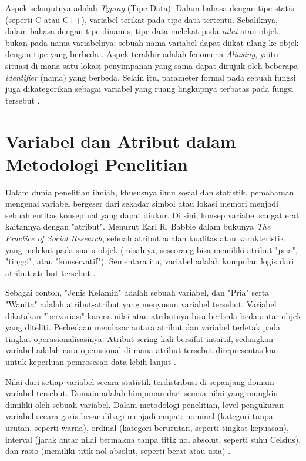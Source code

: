 \documentclass[11pt,a4paper]{article}
\begin{document}
Aspek selanjutnya adalah \textit{Typing} (Tipe Data). Dalam bahasa dengan tipe statis (seperti C atau C++), variabel terikat pada tipe data tertentu. Sebaliknya, dalam bahasa dengan tipe dinamis, tipe data melekat pada \textit{nilai} atau objek, bukan pada nama variabelnya; sebuah nama variabel dapat diikat ulang ke objek dengan tipe yang berbeda \cite{wikipedia_cs}. Aspek terakhir adalah fenomena \textit{Aliasing}, yaitu situasi di mana satu lokasi penyimpanan yang sama dapat dirujuk oleh beberapa \textit{identifier} (nama) yang berbeda. Selain itu, parameter formal pada sebuah fungsi juga dikategorikan sebagai variabel yang ruang lingkupnya terbatas pada fungsi tersebut \cite{wikipedia_cs}.

\section{Variabel dan Atribut dalam Metodologi Penelitian}

Dalam dunia penelitian ilmiah, khususnya ilmu sosial dan statistik, pemahaman mengenai variabel bergeser dari sekadar simbol atau lokasi memori menjadi sebuah entitas konseptual yang dapat diukur. Di sini, konsep variabel sangat erat kaitannya dengan "atribut". Menurut Earl R. Babbie dalam bukunya \textit{The Practice of Social Research}, sebuah atribut adalah kualitas atau karakteristik yang melekat pada suatu objek (misalnya, seseorang bisa memiliki atribut "pria", "tinggi", atau "konservatif"). Sementara itu, variabel adalah kumpulan logis dari atribut-atribut tersebut \cite{babbie, wikipedia_research}.

Sebagai contoh, "Jenis Kelamin" adalah sebuah variabel, dan "Pria" serta "Wanita" adalah atribut-atribut yang menyusun variabel tersebut. Variabel dikatakan "bervariasi" karena nilai atau atributnya bisa berbeda-beda antar objek yang diteliti. Perbedaan mendasar antara atribut dan variabel terletak pada tingkat operasionalisasinya. Atribut sering kali bersifat intuitif, sedangkan variabel adalah cara operasional di mana atribut tersebut direpresentasikan untuk keperluan pemrosesan data lebih lanjut \cite{wikipedia_research}.

Nilai dari setiap variabel secara statistik terdistribusi di sepanjang domain variabel tersebut. Domain adalah himpunan dari semua nilai yang mungkin dimiliki oleh sebuah variabel. Dalam metodologi penelitian, level pengukuran variabel secara garis besar dibagi menjadi empat: nominal (kategori tanpa urutan, seperti warna), ordinal (kategori berurutan, seperti tingkat kepuasan), interval (jarak antar nilai bermakna tanpa titik nol absolut, seperti suhu Celsius), dan rasio (memiliki titik nol absolut, seperti berat atau usia) \cite{babbie}.
\end{document}
